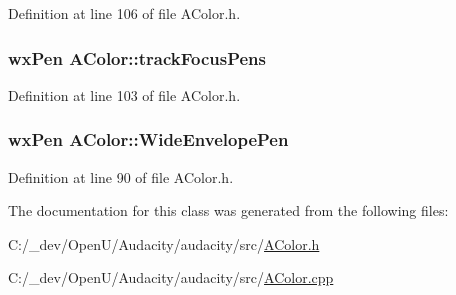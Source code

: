 Definition at line 106 of file A\+Color.\+h.

\subsubsection[{\texorpdfstring{track\+Focus\+Pens}{trackFocusPens}}]{\setlength{\rightskip}{0pt plus 5cm}wx\+Pen A\+Color\+::track\+Focus\+Pens\hspace{0.3cm}{\ttfamily [static]}}\hypertarget{class_a_color_a265f520d190288cc500560728745e48f}{}\label{class_a_color_a265f520d190288cc500560728745e48f}


Definition at line 103 of file A\+Color.\+h.

\subsubsection[{\texorpdfstring{Wide\+Envelope\+Pen}{WideEnvelopePen}}]{\setlength{\rightskip}{0pt plus 5cm}wx\+Pen A\+Color\+::\+Wide\+Envelope\+Pen\hspace{0.3cm}{\ttfamily [static]}}\hypertarget{class_a_color_a287fd4e5f875c7c18b83d358baaa9784}{}\label{class_a_color_a287fd4e5f875c7c18b83d358baaa9784}


Definition at line 90 of file A\+Color.\+h.



The documentation for this class was generated from the following files\+:\begin{DoxyCompactItemize}
\item 
C\+:/\+\_\+dev/\+Open\+U/\+Audacity/audacity/src/\hyperlink{_a_color_8h}{A\+Color.\+h}\item 
C\+:/\+\_\+dev/\+Open\+U/\+Audacity/audacity/src/\hyperlink{_a_color_8cpp}{A\+Color.\+cpp}\end{DoxyCompactItemize}

